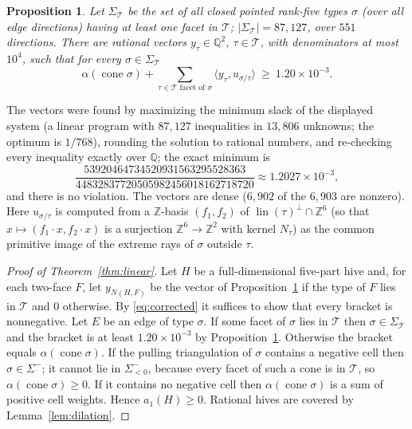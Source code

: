 \documentclass[11pt]{amsart}
\newtheorem{proposition}[theorem]{Proposition}
\theoremstyle{definition}
\DeclareMathOperator{\cone}{cone}
\newcommand{\Z}{\mathbb{Z}}
\newcommand{\Q}{\mathbb{Q}}
\begin{document}
\begin{proposition}\label{prop:certificate}
Let $\Sigma_{\mathcal T}$ be the set of all closed pointed rank-five types
$\sigma$ (over all edge directions) having at least one facet in $\mathcal T$;
$|\Sigma_{\mathcal T}|=87{,}127$, over $551$ directions. There are rational
vectors $y_\tau\in\Q^{2}$, $\tau\in\mathcal T$, with denominators at most
$10^{4}$, such that for every $\sigma\in\Sigma_{\mathcal T}$
\[
  \alpha(\cone\sigma)+\sum_{\tau\in\mathcal T\text{ facet of }\sigma}
  \langle y_\tau,u_{\sigma/\tau}\rangle\ \ge\ 1.20\times10^{-3}.
\]
\end{proposition}

The vectors were found by maximizing the minimum slack of the displayed system
(a linear program with $87{,}127$ inequalities in $13{,}806$ unknowns; the
optimum is $1/768$), rounding the solution to rational numbers, and re-checking
every inequality exactly over $\Q$; the exact minimum is
\[
  \frac{53920464734520931563295528363}{44832837720505982456018162718720}
  \approx 1.2027\times10^{-3},
\]
and there is no violation. The vectors are dense ($6{,}902$ of the $6{,}903$
are nonzero).
Here $u_{\sigma/\tau}$ is computed from a $\Z$-basis $(f_1,f_2)$ of
$\operatorname{lin}(\tau)^{\perp}\cap\Z^{6}$ (so that $x\mapsto(f_1\cdot x,f_2\cdot x)$
is a surjection $\Z^{6}\to\Z^{2}$ with kernel $N_\tau$) as the common primitive
image of the extreme rays of $\sigma$ outside $\tau$.

\begin{proof}[Proof of Theorem~\ref{thm:linear}]
Let $H$ be a full-dimensional five-part hive and, for each two-face $F$, let
$y_{N(H,F)}$ be the vector of Proposition~\ref{prop:certificate} if the type of
$F$ lies in $\mathcal T$ and $0$ otherwise. By \eqref{eq:corrected} it suffices
to show that every bracket is nonnegative. Let $E$ be an edge of type $\sigma$.
If some facet of $\sigma$ lies in $\mathcal T$ then $\sigma\in\Sigma_{\mathcal T}$
and the bracket is at least $1.20\times10^{-3}$ by
Proposition~\ref{prop:certificate}. Otherwise the bracket equals
$\alpha(\cone\sigma)$. If the pulling triangulation of $\sigma$ contains a
negative cell then $\sigma\in\Sigma^{-}$; it cannot lie in $\Sigma^{-}_{<0}$,
because every facet of such a cone is in $\mathcal T$, so
$\alpha(\cone\sigma)\ge0$. If it contains no negative cell then
$\alpha(\cone\sigma)$ is a sum of positive cell weights. Hence $a_1(H)\ge0$.
Rational hives are covered by Lemma~\ref{lem:dilation}.
\end{proof}
\end{document}
